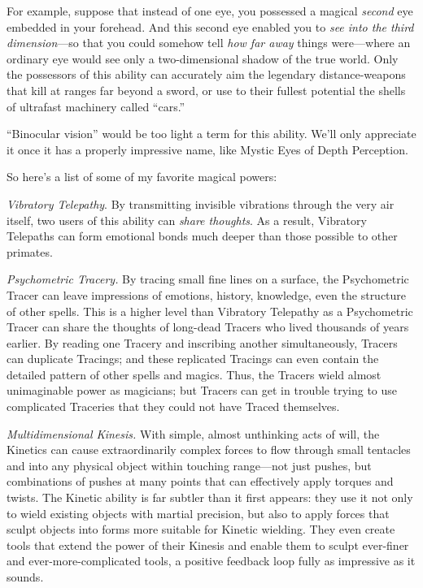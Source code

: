{
 For example, suppose that instead of one eye, you possessed a
magical \textit{second} eye embedded in your forehead. And this second
eye enabled you to \textit{see into the third dimension}{}---so that
you could somehow tell \textit{how far away} things were---where an
ordinary eye would see only a two-dimensional shadow of the true world.
Only the possessors of this ability can accurately aim the legendary
distance-weapons that kill at ranges far beyond a sword, or use to
their fullest potential the shells of ultrafast machinery called
``cars.''}

{
 ``Binocular vision'' would be
too light a term for this ability. We'll only
appreciate it once it has a properly impressive name, like Mystic Eyes
of Depth Perception.}

{
 So here's a list of some of my favorite magical
powers:}

{
 \textit{Vibratory Telepathy}. By transmitting invisible vibrations
through the very air itself, two users of this ability can
\textit{share thoughts}. As a result, Vibratory Telepaths can form
emotional bonds much deeper than those possible to other primates.}

{
 \textit{Psychometric Tracery.} By tracing small fine lines on a
surface, the Psychometric Tracer can leave impressions of emotions,
history, knowledge, even the structure of other spells. This is a
higher level than Vibratory Telepathy as a Psychometric Tracer can
share the thoughts of long-dead Tracers who lived thousands of years
earlier. By reading one Tracery and inscribing another simultaneously,
Tracers can duplicate Tracings; and these replicated Tracings can even
contain the detailed pattern of other spells and magics. Thus, the
Tracers wield almost unimaginable power as magicians; but Tracers can
get in trouble trying to use complicated Traceries that they could not
have Traced themselves.}

{
 \textit{Multidimensional Kinesis.} With simple, almost unthinking
acts of will, the Kinetics can cause extraordinarily complex forces to
flow through small tentacles and into any physical object within
touching range---not just pushes, but combinations of pushes at many
points that can effectively apply torques and twists. The Kinetic
ability is far subtler than it first appears: they use it not only to
wield existing objects with martial precision, but also to apply forces
that sculpt objects into forms more suitable for Kinetic wielding. They
even create tools that extend the power of their Kinesis and enable
them to sculpt ever-finer and ever-more-complicated tools, a positive
feedback loop fully as impressive as it sounds.}

